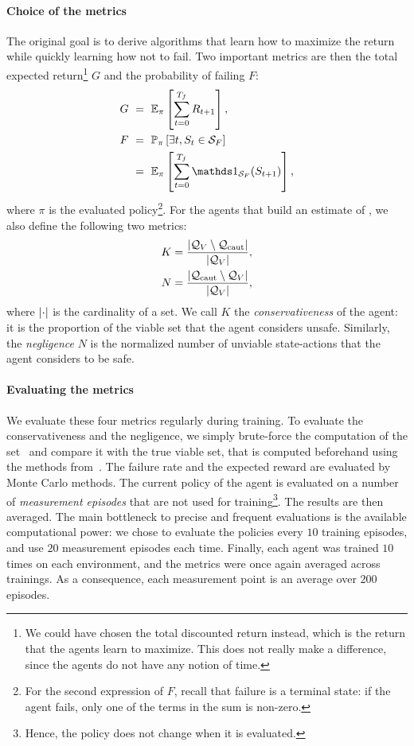 \paragraph{Choice of the metrics} The original goal is to derive algorithms that learn how to maximize the return while quickly learning how not to fail. Two important metrics are then the total expected return\footnote{We could have chosen the total discounted return instead, which is the return that the agents learn to maximize. This does not really make a difference, since the agents do not have any notion of time.} $G$ and the probability of failing $F$:
\begin{align}
	G~&=~\expected_\pi\left[\sum_{t=0}^\Tf R_{t+1}\right],\\
	F~&=~\P_\pi\left[\exists t, S_t\in\SF\right]\nonumber\\
		&=~\expected_\pi\left[\sum_{t=0}^\Tf \indicator_\SF(S_{t+1})\right],
\end{align}
where $\pi$ is the evaluated policy\footnote{For the second expression of $F$, recall that failure is a terminal state: if the agent fails, only one of the terms in the sum is non-zero.}. For the agents that build an estimate of \QV, we also define the following two metrics:
\begin{align}
	K = \frac{{\left|\mathcal{Q}_{V}\setminus\mathcal{Q}_\text{caut}\right|}}{{\left|\mathcal{Q}_{V}\right|}},\\
	N = \frac{{\left|\mathcal{Q}_\text{caut}\setminus\mathcal{Q}_{V}\right|}}{{\left|\mathcal{Q}_{V}\right|}},
\end{align} 
where ${\left|\cdot\right|}$ is the cardinality of a set. We call $K$ the\emph{ conservativeness} of the agent: it is the proportion of the viable set that the agent considers unsafe. Similarly, the\emph{ negligence} $N$ is the normalized number of unviable state-actions that the agent considers to be safe.

\paragraph{Evaluating the metrics} We evaluate these four metrics regularly during training. To evaluate the conservativeness and the negligence, we simply brute-force the computation of the set \Qcaut~and compare it with the true viable set, that is computed beforehand using the methods from~\cite{heim2019beyond}. The failure rate and the expected reward are evaluated by Monte Carlo methods. The current policy of the agent is evaluated on a number of\emph{ measurement episodes} that are not used for training\footnote{Hence, the policy does not change when it is evaluated.}. The results are then averaged. The main bottleneck to precise and frequent evaluations is the available computational power: we chose to evaluate the policies every $10$ training episodes, and use $20$ measurement episodes each time. Finally, each agent was trained $10$ times on each environment, and the metrics were once again averaged across trainings. As a consequence, each measurement point is an average over $200$ episodes.

